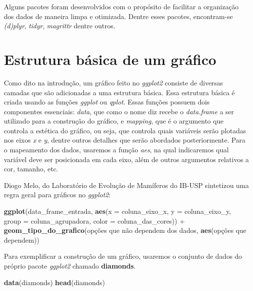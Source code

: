 \documentclass[]{article}
\newenvironment{Shaded}{\begin{snugshade}}{\end{snugshade}}
\newcommand{\KeywordTok}[1]{\textcolor[rgb]{0.13,0.29,0.53}{\textbf{{#1}}}}
\newcommand{\DataTypeTok}[1]{\textcolor[rgb]{0.13,0.29,0.53}{{#1}}}
\newcommand{\StringTok}[1]{\textcolor[rgb]{0.31,0.60,0.02}{{#1}}}
\newcommand{\NormalTok}[1]{{#1}}
\begin{document}
Alguns pacotes foram desenvolvidos com o propósito de facilitar a
organização dos dados de maneira limpa e otimizada. Dentre esses
pacotes, encontram-se \emph{(d)plyr}, \emph{tidyr}, \emph{magrittr}
dentre outros.

\section{Estrutura básica de um
gráfico}\label{estrutura-basica-de-um-grafico}

Como dito na introdução, um gráfico feito no \emph{ggplot2} consiste de
diversas camadas que são adicionadas a uma estrutura básica. Essa
estrutura básica é criada usando as funções \emph{ggplot} ou
\emph{qplot}. Essas funções possuem dois componentes essenciais:
\emph{data}, que como o nome diz recebe o \emph{data.frame} a ser
utilizado para a construção do gráfico, e \emph{mapping}, que é o
argumento que controla a estética do gráfico, ou seja, que controla
quais variáveis serão plotadas nos eixos \emph{x} e \emph{y}, dentre
outros detalhes que serão abordados posteriormente. Para o mapeamento
dos dados, usaremos a função \emph{aes}, na qual indicaremos qual
variável deve ser posicionada em cada eixo, além de outros argumentos
relativos a cor, tamanho, etc.

Diogo Melo, do Laboratório de Evolução de Mamíferos do IB-USP sintetizou
uma regra geral para gráficos no \emph{ggplot2}:

\begin{Shaded}
\begin{Highlighting}[]
\KeywordTok{ggplot}\NormalTok{(data_frame_entrada, }\KeywordTok{aes}\NormalTok{(}\DataTypeTok{x =} \NormalTok{coluna_eixo_x,}
                               \DataTypeTok{y =} \NormalTok{coluna_eixo_y,}
                               \DataTypeTok{group =} \NormalTok{coluna_agrupadora,}
                               \DataTypeTok{color =} \NormalTok{coluna_das_cores))}
\NormalTok{+}\StringTok{ }\KeywordTok{geom_tipo_do_grafico}\NormalTok{(opções que não dependem dos dados,}
                       \KeywordTok{aes}\NormalTok{(opções que dependem))}
\end{Highlighting}
\end{Shaded}

Para exemplificar a construção de um gráfico, usaremos o conjunto de
dados do próprio pacote \emph{ggplot2} chamado \textbf{diamonds}.

\begin{Shaded}
\begin{Highlighting}[]
\KeywordTok{data}\NormalTok{(diamonds)}
\KeywordTok{head}\NormalTok{(diamonds)}
\end{Highlighting}
\end{Shaded}
\end{document}
